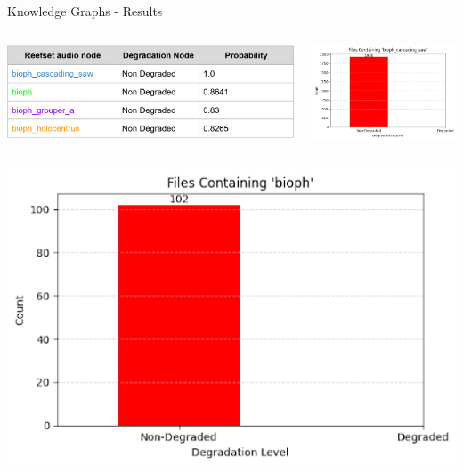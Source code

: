 \begin{frame}{Knowledge Graphs - Results}
    \begin{columns}
        \begin{column}{0.7\textwidth}
            \centering
            \includegraphics[height=1.0\textheight,width=1.0\textwidth,keepaspectratio]{images/knowledge_graph_table.png}
        \end{column}
        \begin{column}{0.3\textwidth}
            \centering
            \includegraphics[height=1.0\textheight,width=1.0\textwidth,keepaspectratio]{images/knowledge_graph_results_1.png}
        \end{column}
    \end{columns}
    \hspace{1cm}
    \begin{columns}
        \begin{column}{0.33\textwidth}
            \centering
            \includegraphics[height=1.0\textheight,width=1.0\textwidth,keepaspectratio]{images/knowledge_graph_results_2.png}

\end{column}
\end{columns}
\end{frame}

